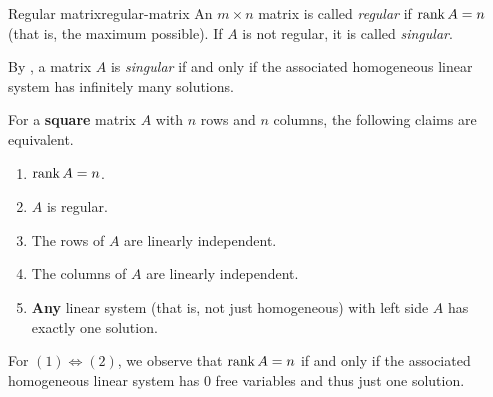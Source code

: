 \begin{definition}{Regular matrix}{regular-matrix}
 An $m \times n$ matrix is called \emph{regular} if $\operatorname{rank} A = n$ (that is, the
 maximum possible). If $A$ is not regular, it is called \emph{singular}.
\end{definition}

\begin{remark}{}{}
 By , a matrix $A$ is \emph{singular}
 if and only if the associated homogeneous linear system has infinitely many
 solutions.
\end{remark}

\begin{corollary}{}{}
 For a \textbf{square} matrix $A$ with $n$ rows and $n$ columns, the following
 claims are equivalent.
 \begin{enumerate}
  \item $\operatorname{rank} A = n$.
  \item $A$ is regular.
  \item The rows of $A$ are linearly independent.
  \item The columns of $A$ are linearly independent.
  \item \textbf{Any} linear system (that is, not just homogeneous) with left
   side $A$ has exactly one solution.
 \end{enumerate}
\end{corollary}
\begin{corproof}
 For $(1) \Leftrightarrow (2)$, we observe that $\operatorname{rank} A = n$ if and only if the
 associated homogeneous linear system has $0$ free variables and thus just one
 solution.
\end{corproof}

